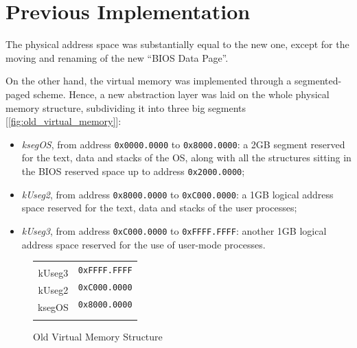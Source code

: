 \documentclass[12pt,a4paper,openright,twoside]{report}
\begin{document}
\section{Previous Implementation}
The physical address space was substantially equal to the new one, except for the moving and renaming of the new ``BIOS Data Page''.

On the other hand, the virtual memory was implemented through a segmented-paged scheme.
Hence, a new abstraction layer was laid on the whole physical memory structure, subdividing it into three big segments [\autoref{fig:old_virtual_memory}]:
\begin{itemize}
	\item \textit{ksegOS}, from address \texttt{0x0000.0000} to \texttt{0x8000.0000}: a 2GB segment reserved for the text, data and stacks of the OS, along with all the structures sitting in the BIOS reserved space up to address \texttt{0x2000.0000};
	\item \textit{kUseg2}, from address \texttt{0x8000.0000} to \texttt{0xC000.0000}: a 1GB logical address space reserved for the text, data and stacks of the user processes;
	\item \textit{kUseg3}, from address \texttt{0xC000.0000} to \texttt{0xFFFF.FFFF}: another 1GB logical address space reserved for the use of user-mode processes.
\end{itemize}

\begin{figure}[h]
	\centering
	\begin{tabular}{cl}
		\multicolumn{1}{m{3cm}}{}                     & \multirow{2}{*}{\texttt{0xFFFF.FFFF}} \\ \cline{1-1}
		\multicolumn{1}{|c|}{\multirow{2}{*}{kUseg3}} &                                       \\
		\multicolumn{1}{|c|}{}                        & \multirow{2}{*}{\texttt{0xC000.0000}} \\ \cline{1-1}
		\multicolumn{1}{|c|}{\multirow{2}{*}{kUseg2}} &                                       \\
		\multicolumn{1}{|c|}{}                        & \multirow{2}{*}{\texttt{0x8000.0000}} \\ \cline{1-1}
		\multicolumn{1}{|c|}{\multirow{4}{*}{ksegOS}} &                                       \\
		\multicolumn{1}{|c|}{}                        & \multirow{4}{*}{}                     \\
		\multicolumn{1}{|c|}{}                        &                                       \\
		\multicolumn{1}{|c|}{}                        & \multirow{2}{*}{\texttt{0x0000.0000}} \\ \cline{1-1}
		\multicolumn{1}{l}{}                          &
	\end{tabular}
	\caption{Old Virtual Memory Structure}
	\label{fig:old_virtual_memory}
\end{figure}
\end{document}
